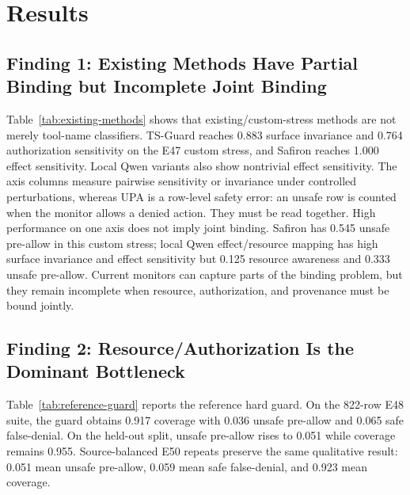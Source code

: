 \section{Results}

\subsection{Finding 1: Existing Methods Have Partial Binding but Incomplete Joint Binding}



Table~\ref{tab:existing-methods} shows that existing/custom-stress methods are not merely tool-name classifiers. TS-Guard reaches 0.883 surface invariance and 0.764 authorization sensitivity on the E47 custom stress, and Safiron reaches 1.000 effect sensitivity. Local Qwen variants also show nontrivial effect sensitivity. The axis columns measure pairwise sensitivity or invariance under controlled perturbations, whereas UPA is a row-level safety error: an unsafe row is counted when the monitor allows a denied action. They must be read together. High performance on one axis does not imply joint binding. Safiron has 0.545 unsafe pre-allow in this custom stress; local Qwen effect/resource mapping has high surface invariance and effect sensitivity but 0.125 resource awareness and 0.333 unsafe pre-allow. Current monitors can capture parts of the binding problem, but they remain incomplete when resource, authorization, and provenance must be bound jointly.

\subsection{Finding 2: Resource/Authorization Is the Dominant Bottleneck}




Table~\ref{tab:reference-guard} reports the reference hard guard. On the 822-row E48 suite, the guard obtains 0.917 coverage with 0.036 unsafe pre-allow and 0.065 safe false-denial. On the held-out split, unsafe pre-allow rises to 0.051 while coverage remains 0.955. Source-balanced E50 repeats preserve the same qualitative result: 0.051 mean unsafe pre-allow, 0.059 mean safe false-denial, and 0.923 mean coverage.

